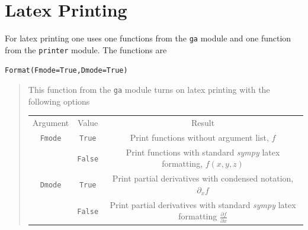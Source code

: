 \documentclass[12pt]{report}
\newcommand{\lp}{\left (}
\newcommand{\rp}{\right )}
\newcommand{\f}[2]{{#1}\lp {#2} \rp}
\newcommand{\T}[1]{\texttt{#1}}
\begin{document}
\section{Latex Printing}\label{LatexPrinting}

For latex printing one uses one functions from the \T{ga} module and one
function from the \T{printer} module.  The
functions are

\T{Format(Fmode=True,Dmode=True)}
\begin{quote}
   This function from the \T{ga} module turns on latex printing with the
   following options

\begin{tabular}{ccc}
         Argument &  Value &  Result \\
         \T{Fmode} &  \T{True} &  Print functions without argument list, $f$ \\
               &  \T{False} &  Print functions with standard \emph{sympy} latex formatting, $\f{f}{x,y,z}$ \\
         \T{Dmode} &  \T{True} &  Print partial derivatives with condensed notation, $\partial_{x}f$ \\
               &  \T{False} &  Print partial derivatives with standard \emph{sympy} latex formatting $\frac{\partial f}{\partial x}$ \\
\end{tabular}
\end{quote}
\end{document}
